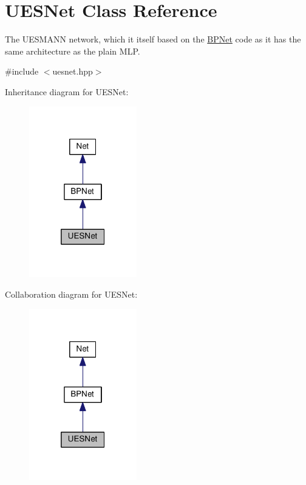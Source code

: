 \hypertarget{classUESNet}{}\section{U\+E\+S\+Net Class Reference}
\label{classUESNet}


The U\+E\+S\+M\+A\+NN network, which it itself based on the \hyperlink{classBPNet}{B\+P\+Net} code as it has the same architecture as the plain M\+LP.  




{\ttfamily \#include $<$uesnet.\+hpp$>$}



Inheritance diagram for U\+E\+S\+Net\+:
\nopagebreak
\begin{figure}[H]
\begin{center}
\leavevmode
\includegraphics[width=133pt]{classUESNet__inherit__graph}
\end{center}
\end{figure}


Collaboration diagram for U\+E\+S\+Net\+:
\nopagebreak
\begin{figure}[H]
\begin{center}
\leavevmode
\includegraphics[width=133pt]{classUESNet__coll__graph}
\end{center}
\end{figure}
